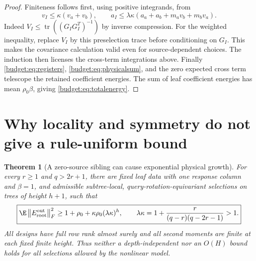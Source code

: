 \documentclass[11pt,oneside,openany,a4paper]{book}
\numberwithin{equation}{chapter}
\newtheorem{theorem}{Theorem}[chapter]
\theoremstyle{definition}
\theoremstyle{remark}
\newcommand{\F}[1]{\left\lVert#1\right\rVert_F}
\DeclareMathOperator{\tr}{tr}\DeclareMathOperator{\rank}{rank}
\begin{document}
\begin{proof}
Finiteness follows first, using positive integrands, from
\[
 v_I\le\kappa(v_a+v_b),\qquad
 a_I\le\lambda\kappa(a_a+a_b+m_av_b+m_bv_a).
\]
Indeed $V_I\le\tr((G_IG_I^T)^{-1})$ by inverse compression. For the weighted inequality, replace $V_I$ by this preselection trace before conditioning on $G_I$. This makes the covariance calculation valid even for source-dependent choices. The induction then licenses the cross-term integrations above. Finally \eqref{budget:eq:registers}, \eqref{budget:eq:physicalsum}, and the zero expected cross term telescope the retained coefficient energies. The sum of leaf coefficient energies has mean $\rho_0\beta$, giving \eqref{budget:eq:totalenergy}.
\end{proof}

\section{Why locality and symmetry do not give a rule-uniform bound}\label{budget:sec:negative}
\begin{theorem}[A zero-source sibling can cause exponential physical growth]\label{budget:thm:counter}
For every $r\ge1$ and $q>2r+1$, there are fixed leaf data with one response column and $\beta=1$, and admissible subtree-local, query-rotation-equivariant selections on trees of height $h+1$, such that
\begin{equation}\label{budget:eq:lower}
 \boxed{\E\F{E_{\rm root}^{\rm out}}^2
 \ge1+\rho_0+\kappa\rho_0(\lambda\kappa)^h,\qquad
 \lambda\kappa=1+\frac{r}{(q-r)(q-2r-1)}>1.}
\end{equation}
All designs have full row rank almost surely and all second moments are finite at each fixed finite height. Thus neither a depth-independent nor an $O(H)$ bound holds for all selections allowed by the nonlinear model.
\end{theorem}
\end{document}

